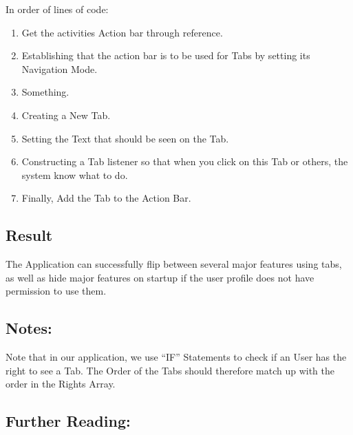 \noindent In order of lines of code:\\
\begin{enumerate}
\item Get the activities Action bar through reference.
\item Establishing that the action bar is to be used for Tabs by setting its Navigation Mode.\\
\item Something.
\item Creating a New Tab.
\item Setting the Text that should be seen on the Tab.
\item Constructing a Tab listener so that when you click on this Tab or others, the system know what to do.\\
\item Finally, Add the Tab to the Action Bar.
\end{enumerate}

\subsection*{Result}
The Application can successfully flip between several major features using tabs, as well as hide major features on startup if the user profile does not have permission to use them.

\subsection*{Notes:}
Note that in our application, we use ``IF'' Statements to check if an User has the right to see a Tab.
The Order of the Tabs should therefore match up with the order in the Rights Array.

\subsection*{Further Reading:}
